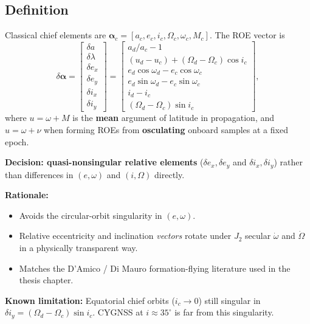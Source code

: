 \documentclass[11pt]{article}
\begin{document}
\subsection{Definition}

Classical chief elements are $\bm{\alpha}_c = [a_c, e_c, i_c, \Omega_c, \omega_c, M_c]$. The ROE vector is
\begin{equation}
\delta\bm{\alpha} =
\begin{bmatrix}
\delta a \\ \delta\lambda \\ \delta e_x \\ \delta e_y \\ \delta i_x \\ \delta i_y
\end{bmatrix}
=
\begin{bmatrix}
a_d/a_c - 1 \\
(u_d - u_c) + (\Omega_d-\Omega_c)\cos i_c \\
e_d\cos\omega_d - e_c\cos\omega_c \\
e_d\sin\omega_d - e_c\sin\omega_c \\
i_d - i_c \\
(\Omega_d - \Omega_c)\sin i_c
\end{bmatrix},
\label{eq:roes}
\end{equation}
where $u = \omega + M$ is the \textbf{mean} argument of latitude in propagation, and $u = \omega + \nu$ when forming ROEs from \textbf{osculating} onboard samples at a fixed epoch.

\textbf{Decision: quasi-nonsingular relative elements} ($\delta e_x,\delta e_y$ and $\delta i_x,\delta i_y$) rather than differences in $(e,\omega)$ and $(i,\Omega)$ directly.

\textbf{Rationale:}
\begin{itemize}
    \item Avoids the circular-orbit singularity in $(e,\omega)$.
    \item Relative eccentricity and inclination \emph{vectors} rotate under $J_2$ secular $\dot\omega$ and $\dot\Omega$ in a physically transparent way.
    \item Matches the D'Amico / Di Mauro formation-flying literature used in the thesis chapter.
\end{itemize}

\textbf{Known limitation:} Equatorial chief orbits ($i_c \to 0$) still singular in $\delta i_y = (\Omega_d-\Omega_c)\sin i_c$. CYGNSS at $i \approx 35^\circ$ is far from this singularity.
\end{document}
